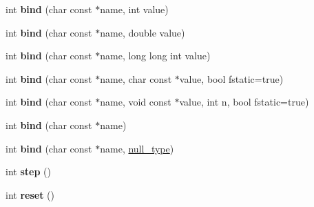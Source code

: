 \begin{DoxyCompactItemize}
\item 
\hypertarget{classsqlite3pp_1_1statement_a9cac65a01fdaf5122332dc9e0026c759}{int {\bfseries bind} (char const $\ast$name, int value)}\label{classsqlite3pp_1_1statement_a9cac65a01fdaf5122332dc9e0026c759}

\item 
\hypertarget{classsqlite3pp_1_1statement_a9f1ad83c30d8807131b2276a7f58b884}{int {\bfseries bind} (char const $\ast$name, double value)}\label{classsqlite3pp_1_1statement_a9f1ad83c30d8807131b2276a7f58b884}

\item 
\hypertarget{classsqlite3pp_1_1statement_ad4e4f332f328cb88d711895dc21c1336}{int {\bfseries bind} (char const $\ast$name, long long int value)}\label{classsqlite3pp_1_1statement_ad4e4f332f328cb88d711895dc21c1336}

\item 
\hypertarget{classsqlite3pp_1_1statement_aa7cc4268bac627bf48475ee665fa9ed7}{int {\bfseries bind} (char const $\ast$name, char const $\ast$value, bool fstatic=true)}\label{classsqlite3pp_1_1statement_aa7cc4268bac627bf48475ee665fa9ed7}

\item 
\hypertarget{classsqlite3pp_1_1statement_a21938505af5ed1bf8063e66f4943d7ec}{int {\bfseries bind} (char const $\ast$name, void const $\ast$value, int n, bool fstatic=true)}\label{classsqlite3pp_1_1statement_a21938505af5ed1bf8063e66f4943d7ec}

\item 
\hypertarget{classsqlite3pp_1_1statement_ab651ec3075a43e97fcb0868c896da561}{int {\bfseries bind} (char const $\ast$name)}\label{classsqlite3pp_1_1statement_ab651ec3075a43e97fcb0868c896da561}

\item 
\hypertarget{classsqlite3pp_1_1statement_a27e20f9382766a79229dfe824a7dbd4b}{int {\bfseries bind} (char const $\ast$name, \hyperlink{classsqlite3pp_1_1null__type}{null\-\_\-type})}\label{classsqlite3pp_1_1statement_a27e20f9382766a79229dfe824a7dbd4b}

\item 
\hypertarget{classsqlite3pp_1_1statement_ab895bf77dae14a2854ee58716883d434}{int {\bfseries step} ()}\label{classsqlite3pp_1_1statement_ab895bf77dae14a2854ee58716883d434}

\item 
\hypertarget{classsqlite3pp_1_1statement_a46b99b07c787f688a0857abafa2be72d}{int {\bfseries reset} ()}\label{classsqlite3pp_1_1statement_a46b99b07c787f688a0857abafa2be72d}

\end{DoxyCompactItemize}
